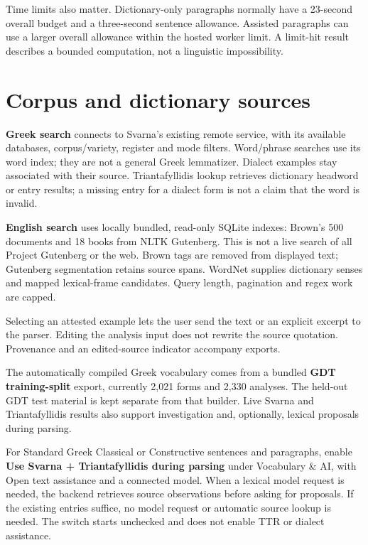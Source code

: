 \documentclass[11pt,a4paper]{article}
\begin{document}
Time limits also matter. Dictionary-only paragraphs normally have a
23-second overall budget and a three-second sentence allowance. Assisted
paragraphs can use a larger overall allowance within the hosted worker
limit. A limit-hit result describes a bounded computation, not a
linguistic impossibility.

\section{Corpus and dictionary
sources}\label{corpus-and-dictionary-sources}

\textbf{Greek search} connects to Svarna's existing remote service, with
its available databases, corpus/variety, register and mode filters.
Word/phrase searches use its word index; they are not a general Greek
lemmatizer. Dialect examples stay associated with their source.
Triantafyllidis lookup retrieves dictionary headword or entry results; a
missing entry for a dialect form is not a claim that the word is
invalid.

\textbf{English search} uses locally bundled, read-only SQLite indexes:
Brown's 500 documents and 18 books from NLTK Gutenberg. This is not a
live search of all Project Gutenberg or the web. Brown tags are removed
from displayed text; Gutenberg segmentation retains source spans.
WordNet supplies dictionary senses and mapped lexical-frame candidates.
Query length, pagination and regex work are capped.

Selecting an attested example lets the user send the text or an explicit
excerpt to the parser. Editing the analysis input does not rewrite the
source quotation. Provenance and an edited-source indicator accompany
exports.

The automatically compiled Greek vocabulary comes from a bundled
\textbf{GDT training-split} export, currently 2,021 forms and 2,330
analyses. The held-out GDT test material is kept separate from that
builder. Live Svarna and Triantafyllidis results also support
investigation and, optionally, lexical proposals during parsing.

For Standard Greek Classical or Constructive sentences and paragraphs,
enable \textbf{Use Svarna + Triantafyllidis during parsing} under
Vocabulary \& AI, with Open text assistance and a connected model. When
a lexical model request is needed, the backend retrieves source
observations before asking for proposals. If the existing entries
suffice, no model request or automatic source lookup is needed. The
switch starts unchecked and does not enable TTR or dialect assistance.
\end{document}
